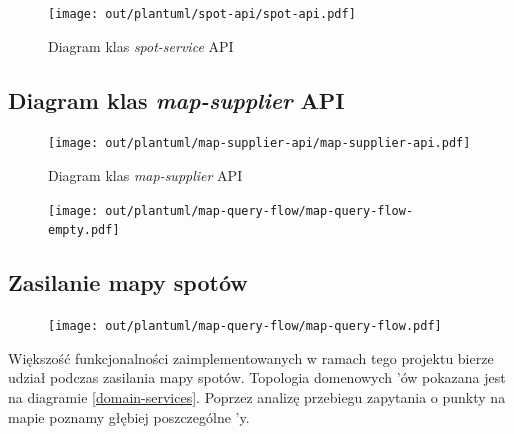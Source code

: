 \begin{figure}[H]
	\begin{center}
		\texttt{[image: out/plantuml/spot-api/spot-api.pdf]}
	\end{center}
    \caption{Diagram klas \emph{spot-service} API}
    \label{spot-api}
\end{figure}

\subsection{Diagram klas \emph{map-supplier} API}

\begin{figure}[H]
	\begin{center}
		\texttt{[image: out/plantuml/map-supplier-api/map-supplier-api.pdf]}
	\end{center}
    \caption{Diagram klas \emph{map-supplier} API}
    \label{ms-api}
\end{figure}


\begin{figure}[H]
	\begin{center}
		\texttt{[image: out/plantuml/map-query-flow/map-query-flow-empty.pdf]}
	\end{center}
\end{figure}

\subsection{Zasilanie mapy spotów}

\begin{figure}[H]
	\begin{center}
		\texttt{[image: out/plantuml/map-query-flow/map-query-flow.pdf]}
	\end{center}
\end{figure}

Większość funkcjonalności zaimplementowanych w ramach tego projektu bierze udział podczas zasilania mapy spotów.
Topologia domenowych 'ów pokazana jest na diagramie \ref{domain-services}. 
Poprzez analizę przebiegu zapytania o punkty na mapie poznamy głębiej poszczególne 'y.

